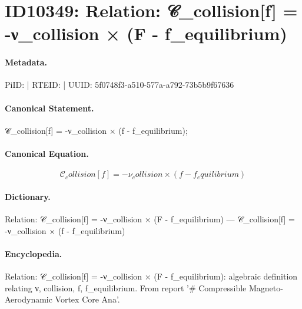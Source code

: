 \section*{ID10349: Relation: 𝒞\_collision[f] = -ν\_collision × (F - f\_equilibrium)}
\paragraph{Metadata.}
PiID:  | RTEID:  | UUID: 5f0748f3-a510-577a-a792-73b5b9f67636

\paragraph{Canonical Statement.}
𝒞\_collision[f] = -ν\_collision × (f - f\_equilibrium);

\paragraph{Canonical Equation.}
\[
𝒞_collision[f] = -ν_collision × (f - f_equilibrium)
\]

\paragraph{Dictionary.}
Relation: 𝒞\_collision[f] = -ν\_collision × (F - f\_equilibrium) — 𝒞\_collision[f] = -ν\_collision × (f - f\_equilibrium)

\paragraph{Encyclopedia.}
Relation: 𝒞\_collision[f] = -ν\_collision × (F - f\_equilibrium): algebraic definition relating ν, collision, f, f\_equilibrium. From report '\# Compressible Magneto-Aerodynamic Vortex Core Ana'.
